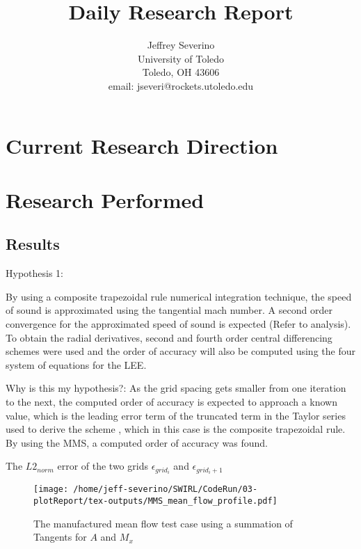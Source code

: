\documentclass[a4paper]{article}
\begin{document}
\begin{titlepage}

    \title{
    Daily Research Report}

    \author{ Jeffrey Severino \\
        University of Toledo \\
        Toledo, OH  43606 \\
    email: jseveri@rockets.utoledo.edu}


    \maketitle

\end{titlepage}
\section{Current Research Direction}
\section{Research Performed}

\subsection{Results}

Hypothesis 1: 

By using a composite trapezoidal rule numerical integration technique, the speed
of sound is approximated using the tangential mach number. A second order 
convergence for the approximated speed of sound is expected (Refer to analysis). 
To obtain the radial derivatives, second and fourth order central differencing 
schemes were used and the order of accuracy will also be computed using the 
four system of equations for the LEE. 

Why is this my hypothesis?:
As the grid spacing gets smaller from one iteration to the next, the computed order of accuracy is
expected to approach a known value, which is the leading error term of the 
truncated term in the Taylor series used to derive the scheme , which in this
case is the composite trapezoidal rule. By using the MMS, a computed order
of accuracy was found. 





The $L2_{norm}$ error of the two grids 
$\epsilon_{grid_i}$ and $\epsilon_{grid_i+1}$
\begin{figure}[!]
    \centering
    \texttt{[image: /home/jeff-severino/SWIRL/CodeRun/03-plotReport/tex-outputs/MMS\_mean\_flow\_profile.pdf]}
    \caption{The manufactured mean flow test case using a summation of Tangents for $A$ and $M_x$}
    \label{fig:1}
\end{figure}
\end{document}
